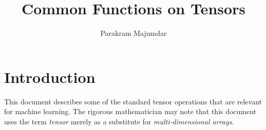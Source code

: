 \documentclass{article}
\title{Common Functions on Tensors}
\author{Parakram Majumdar}
\begin{document}
  \maketitle

\newcommand{\R}{\mathbb{R}}
\newcommand{\Prob}[2]{\mathbb{#1}\left[ #2 \right]}
\newenvironment{where}{\noindent{}where\begin{itemize}}{\end{itemize}}
  
\section{Introduction}
  This document describes some of the standard tensor operations
  that are relevant for machine learning.
  The rigorous mathematician may note 
  that this document uses the term \emph{tensor}
  merely as a substitute for \emph{multi-dimensional arrays}.
  
\end{document}
